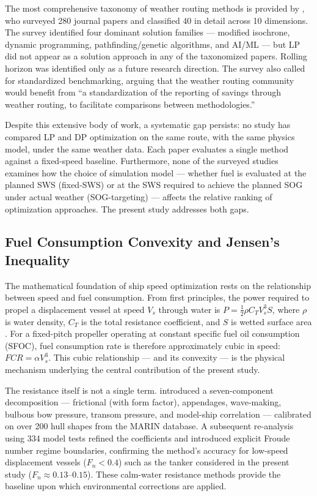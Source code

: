 \documentclass[review]{elsarticle}
\begin{document}
The most comprehensive taxonomy of weather routing methods is provided by \cite{Zis2020}, who surveyed 280 journal papers and classified 40 in detail across 10 dimensions. The survey identified four dominant solution families --- modified isochrone, dynamic programming, pathfinding/genetic algorithms, and AI/ML --- but LP did not appear as a solution approach in any of the taxonomized papers. Rolling horizon was identified only as a future research direction. The survey also called for standardized benchmarking, arguing that the weather routing community would benefit from ``a standardization of the reporting of savings through weather routing, to facilitate comparisons between methodologies.''

Despite this extensive body of work, a systematic gap persists: no study has compared LP and DP optimization on the same route, with the same physics model, under the same weather data. Each paper evaluates a single method against a fixed-speed baseline. Furthermore, none of the surveyed studies examines how the choice of simulation model --- whether fuel is evaluated at the planned SWS (fixed-SWS) or at the SWS required to achieve the planned SOG under actual weather (SOG-targeting) --- affects the relative ranking of optimization approaches. The present study addresses both gaps.

\subsection{Fuel Consumption Convexity and Jensen's Inequality}
\label{sec:lit-convexity}

The mathematical foundation of ship speed optimization rests on the relationship between speed and fuel consumption. From first principles, the power required to propel a displacement vessel at speed $V_s$ through water is $P = \frac{1}{2} \rho C_T V_s^3 S$, where $\rho$ is water density, $C_T$ is the total resistance coefficient, and $S$ is wetted surface area \cite{Psaraftis2023}. For a fixed-pitch propeller operating at constant specific fuel oil consumption (SFOC), fuel consumption rate is therefore approximately cubic in speed: $FCR = \alpha V_s^3$. This cubic relationship --- and its convexity --- is the physical mechanism underlying the central contribution of the present study.

The resistance itself is not a single term. \cite{Holtrop1982} introduced a seven-component decomposition --- frictional (with form factor), appendages, wave-making, bulbous bow pressure, transom pressure, and model-ship correlation --- calibrated on over 200 hull shapes from the MARIN database. A subsequent re-analysis using 334 model tests \cite{Holtrop1984} refined the coefficients and introduced explicit Froude number regime boundaries, confirming the method's accuracy for low-speed displacement vessels ($F_n < 0.4$) such as the tanker considered in the present study ($F_n \approx 0.13$--$0.15$). These calm-water resistance methods provide the baseline upon which environmental corrections are applied.
\end{document}
